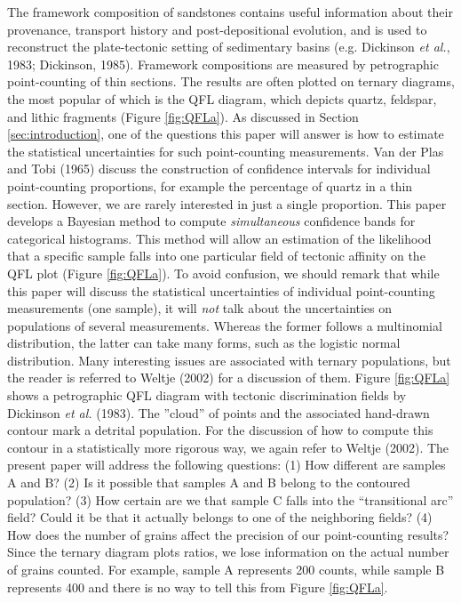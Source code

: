 \documentclass{article}
\begin{document}
The  framework composition of  sandstones contains  useful information
about  their  provenance,   transport  history  and  post-depositional
evolution, and  is used to  reconstruct the plate-tectonic  setting of
sedimentary  basins (e.g.   Dickinson {\it  et al.},  1983; Dickinson,
1985).    Framework   compositions   are  measured   by   petrographic
point-counting  of thin  sections. The  results are  often  plotted on
ternary diagrams, the most popular  of which is the QFL diagram, which
depicts    quartz,   feldspar,    and    lithic   fragments    (Figure
\ref{fig:QFLa}). As  discussed in Section  \ref{sec:introduction}, one
of  the  questions this  paper  will answer  is  how  to estimate  the
statistical uncertainties  for such point-counting  measurements.  Van
der  Plas  and Tobi  (1965)  discuss  the  construction of  confidence
intervals for  individual point-counting proportions,  for example the
percentage  of quartz  in  a  thin section.   However,  we are  rarely
interested  in  just  a  single  proportion.  This  paper  develops  a
Bayesian  method to  compute {\it  simultaneous} confidence  bands for
categorical histograms.   This method will allow an  estimation of the
likelihood that a  specific sample falls into one  particular field of
tectonic affinity  on the QFL plot (Figure  \ref{fig:QFLa}).  To avoid
confusion, we  should remark  that while this  paper will  discuss the
statistical  uncertainties of  individual  point-counting measurements
(one  sample), it  will  {\it  not} talk  about  the uncertainties  on
populations  of several  measurements.  Whereas  the former  follows a
multinomial distribution, the latter can  take many forms, such as the
logistic normal distribution.   Many interesting issues are associated
with ternary populations, but the  reader is referred to Weltje (2002)
for a discussion of  them.  Figure \ref{fig:QFLa} shows a petrographic
QFL diagram  with tectonic discrimination fields by  Dickinson {\it et
al.}  (1983).   The ''cloud'' of points and  the associated hand-drawn
contour  mark a  detrital population.   For the  discussion of  how to
compute this  contour in a  statistically more rigorous way,  we again
refer to Weltje (2002).  The  present paper will address the following
questions: (1) How different are samples  A and B?  (2) Is it possible
that  samples A and  B belong  to the  contoured population?   (3) How
certain  are we  that sample  C  falls into  the ``transitional  arc''
field?  Could it be that it actually belongs to one of the neighboring
fields?  (4) How does the number of grains affect the precision of our
point-counting results?   Since the  ternary diagram plots  ratios, we
lose information on the actual number of grains counted.  For example,
sample  A represents  200 counts,  while sample  B represents  400 and
there is no way to tell this from Figure \ref{fig:QFLa}.
\end{document}
